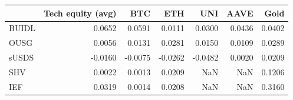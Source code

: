 \begin{tabular}{lrrrrrr}
\toprule
 & Tech equity (avg) & BTC & ETH & UNI & AAVE & Gold \\
\midrule
BUIDL & 0.0652 & 0.0591 & 0.0111 & 0.0300 & 0.0436 & 0.0402 \\
OUSG & 0.0056 & 0.0131 & 0.0281 & 0.0150 & 0.0109 & 0.0289 \\
sUSDS & -0.0160 & -0.0075 & -0.0262 & -0.0482 & 0.0020 & 0.0209 \\
SHV & 0.0022 & 0.0013 & 0.0209 & NaN & NaN & 0.1206 \\
IEF & 0.0319 & 0.0014 & 0.0208 & NaN & NaN & 0.3160 \\
\bottomrule
\end{tabular}
